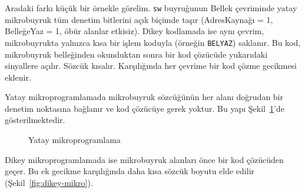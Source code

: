 Aradaki farkı küçük bir örnekle görelim. \texttt{sw} buyruğunun Bellek çevriminde yatay mikrobuyruk tüm denetim bitlerini açık biçimde taşır (AdresKaynağı = 1, BelleğeYaz = 1, öbür alanlar etkisiz). Dikey kodlamada ise aynı çevrim, mikrobuyrukta yalnızca kısa bir işlem koduyla (örneğin \texttt{BELYAZ}) saklanır. Bu kod, mikrobuyruk belleğinden okunduktan sonra bir kod çözücüde yukarıdaki sinyallere açılır. Sözcük kısalır. Karşılığında her çevrime bir kod çözme gecikmesi eklenir.

Yatay mikroprogramlamada mikrobuyruk sözcüğünün her alanı doğrudan bir denetim noktasına bağlanır ve kod çözücüye gerek yoktur. Bu yapı Şekil~\ref{fig:yatay-mikro}'de gösterilmektedir.

\begin{figure}[htbp]
\centering
{}
\caption{Yatay mikroprogramlama}
\label{fig:yatay-mikro}
\end{figure}

Dikey mikroprogramlamada ise mikrobuyruk alanları önce bir kod çözücüden geçer. Bu ek gecikme karşılığında daha kısa sözcük boyutu elde edilir (Şekil~\ref{fig:dikey-mikro}).

